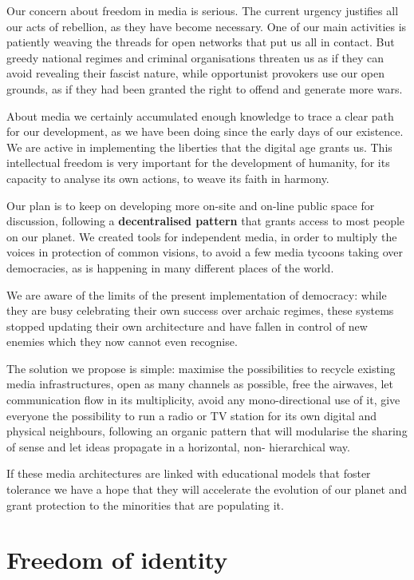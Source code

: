 Our concern about freedom in media is serious. The current urgency
justif\hbox{}ies all our acts of rebellion, as they have become necessary. One
of our main activities is patiently weaving the threads for open networks that
put us all in contact. But greedy national regimes and criminal organisations
threaten us as if they can avoid revealing their fascist nature, while
opportunist provokers use our open grounds, as if they had been granted the
right to of\hbox{}fend and generate more wars.

About media we certainly accumulated enough knowledge to trace a clear path for
our development, as we have been doing since the early days of our existence. We
are active in implementing the liberties that the digital age grants us. This
intellectual freedom is very important for the development of humanity, for its
capacity to analyse its own actions, to weave its faith in harmony.

Our plan is to keep on developing more on-site and on-line public space for
discussion, following a \textbf{decentralised pattern} that grants access to
most people on our planet. We created tools for independent media, in order to
multiply the voices in protection of common visions, to avoid a few media
tycoons taking over democracies, as is happening in many dif\hbox{}ferent places
of the world.

We are aware of the limits of the present implementation of democracy: while
they are busy celebrating their own success over archaic regimes, these systems
stopped updating their own architecture and have fallen in control of new
enemies which they now cannot even recognise.

The solution we propose is simple: maximise the possibilities to recycle
existing media infrastructures, open as many channels as possible, free the
airwaves, let communication f\hbox{}low in its multiplicity, avoid any
mono-directional use of it, give everyone the possibility to run a radio or TV
station for its own digital and physical neighbours, following an organic
pattern that will modularise the sharing of sense and let ideas propagate in a
horizontal, non- hierarchical way.

If these media architectures are linked with educational models that foster
tolerance we have a hope that they will accelerate the evolution of our planet
and grant protection to the minorities that are populating it.


\section{Freedom of identity}
\label{s:weaver_birds:freedom_identity}

